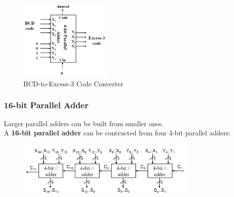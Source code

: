 \documentclass[12pt]{article}
\theoremstyle{definition}
\begin{document}
\begin{figure}[h]
\centering
\includegraphics[width = 0.4\textwidth]{6_6.png}
\caption{BCD-to-Excess-3 Code Converter}
\end{figure}
\subsubsection{16-bit Parallel Adder}
Larger parallel adders can be built from smaller ones.\\A \textbf{16-bit parallel adder} can be contructed from four 4-bit parallel adders:
\clearpage
\begin{figure}[h]
\centering
\includegraphics[width = 0.8\textwidth]{6_7.png}
\end{figure}
\end{document}
